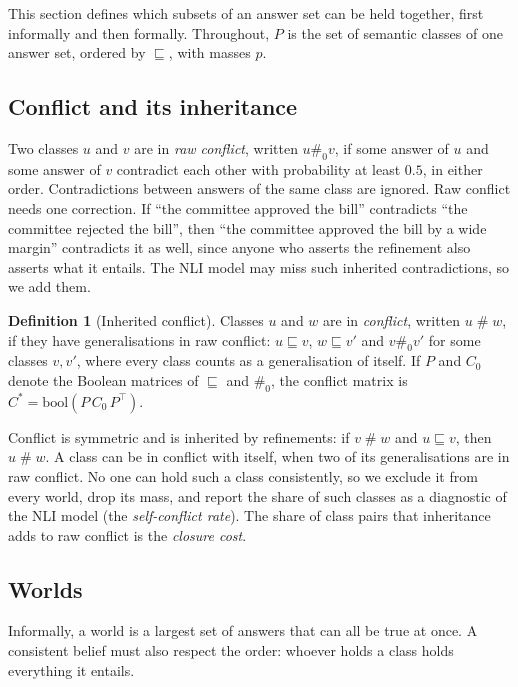 \documentclass[english]{desafiokunumi}
\theoremstyle{definition}
\newtheorem{definition}[proposition]{Definition}
\theoremstyle{remark}
\newcommand{\cf}{\mathrel{\#}}
\newcommand{\cfz}{\mathrel{\#_0}}
\begin{document}
This section defines which subsets of an answer set can be held together, first
informally and then formally. Throughout, $P$ is the set of semantic classes of
one answer set, ordered by $\sqsubseteq$, with masses $p$.

\subsection{Conflict and its inheritance}
\label{sec:conflict}

Two classes $u$ and $v$ are in \emph{raw conflict}, written $u \cfz v$, if
some answer of $u$ and some answer of $v$ contradict each other with
probability at least $0.5$, in either order. Contradictions between answers of
the same class are ignored. Raw conflict needs one correction. If ``the
committee approved the bill'' contradicts ``the committee rejected the bill'',
then ``the committee approved the bill by a wide margin'' contradicts it as
well, since anyone who asserts the refinement also asserts what it entails. The
NLI model may miss such inherited contradictions, so we add them.

\begin{definition}[Inherited conflict]
\label{def:closure}
Classes $u$ and $w$ are in \emph{conflict}, written $u \cf w$, if they have
generalisations in raw conflict: $u \sqsubseteq v$, $w \sqsubseteq v'$ and
$v \cfz v'$ for some classes $v, v'$, where every class counts as a
generalisation of itself. If $P$ and $C_0$ denote the Boolean matrices of
$\sqsubseteq$ and $\cfz$, the conflict matrix is
$C^* = \mathrm{bool}(P\,C_0\,P^{\top})$.
\end{definition}

Conflict is symmetric and is inherited by refinements: if $v \cf w$ and
$u \sqsubseteq v$, then $u \cf w$. A class can be in conflict with itself, when
two of its generalisations are in raw conflict. No one can hold such a class
consistently, so we exclude it from every world, drop its mass, and report the
share of such classes as a diagnostic of the NLI model (the \emph{self-conflict
rate}). The share of class pairs that inheritance adds to raw conflict is the
\emph{closure cost}.

\subsection{Worlds}
\label{sec:mundos}

Informally, a world is a largest set of answers that can all be true at once.
A consistent belief must also respect the order: whoever holds a class holds
everything it entails.
\end{document}
